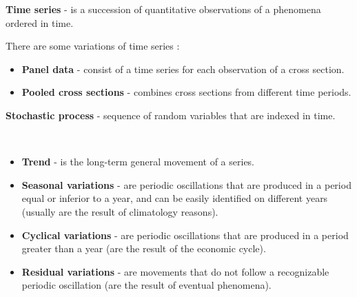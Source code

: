 
	 \begin{f}[Definitions ]

\textbf{Time series} - is a succession of quantitative observations of a phenomena ordered in time.
	
There are some variations of time series :
		\begin{itemize}[leftmargin=*]	
		\item \textbf{Panel data} - consist of a time series for each observation of a cross section.
		\item \textbf{Pooled cross sections} - combines cross sections from different time periods.
	\end{itemize}	
%	
		 \textbf{Stochastic process} - sequence of random variables that are indexed in time.
	\end{f}    
	
	\begin{f}{\ }

	\begin{itemize}[leftmargin=*]
		\item \textbf{Trend} - is the long-term general movement of a series.
		\item \textbf{Seasonal variations} - are periodic oscillations that are produced in a period equal or inferior to a year, and can be easily identified on different years (usually are the result of climatology reasons).
		\item \textbf{Cyclical variations} - are periodic oscillations that are produced in a period greater than a year (are the result of the economic cycle).
		\item \textbf{Residual variations} - are movements that do not follow a recognizable periodic oscillation (are the result of eventual phenomena).
	\end{itemize}
	
	\end{f}    
	
